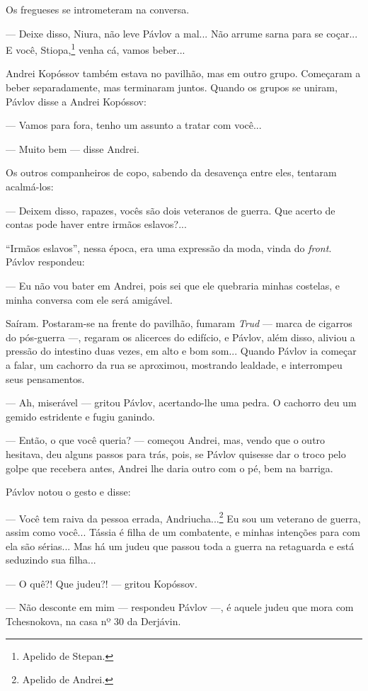 Os fregueses se intrometeram na conversa.

--- Deixe disso, Niura, não leve Pávlov a mal... Não arrume sarna para
se coçar... E você, Stiopa,\footnote{Apelido de Stepan.} venha cá, vamos
beber...

Andrei Kopóssov também estava no pavilhão, mas em outro grupo. Começaram
a beber separadamente, mas terminaram juntos. Quando os grupos se
uniram, Pávlov disse a Andrei Kopóssov:

--- Vamos para fora, tenho um assunto a tratar com você...

--- Muito bem --- disse Andrei.

Os outros companheiros de copo, sabendo da desavença entre eles,
tentaram acalmá-los:

--- Deixem disso, rapazes, vocês são dois veteranos de guerra. Que
acerto de contas pode haver entre irmãos eslavos?...

``Irmãos eslavos'', nessa época, era uma expressão da moda, vinda do
\emph{front}. Pávlov respondeu:

--- Eu não vou bater em Andrei, pois sei que ele quebraria minhas
costelas, e minha conversa com ele será amigável.

Saíram. Postaram-se na frente do pavilhão, fumaram \emph{Trud} --- marca
de cigarros do pós-guerra ---, regaram os alicerces do edifício, e
Pávlov, além disso, aliviou a pressão do intestino duas vezes, em alto e
bom som... Quando Pávlov ia começar a falar, um cachorro da rua se
aproximou, mostrando lealdade, e interrompeu seus pensamentos.

--- Ah, miserável --- gritou Pávlov, acertando-lhe uma pedra. O cachorro
deu um gemido estridente e fugiu ganindo.

--- Então, o que você queria? --- começou Andrei, mas, vendo que o outro
hesitava, deu alguns passos para trás, pois, se Pávlov quisesse dar o
troco pelo golpe que recebera antes, Andrei lhe daria outro com o pé,
bem na barriga.

Pávlov notou o gesto e disse:

--- Você tem raiva da pessoa errada, Andriucha...\footnote{Apelido de
  Andrei.} Eu sou um veterano de guerra, assim como você... Tássia é
filha de um combatente, e minhas intenções para com ela são sérias...
Mas há um judeu que passou toda a guerra na retaguarda e está seduzindo
sua filha...

--- O quê?! Que judeu?! --- gritou Kopóssov.

--- Não desconte em mim --- respondeu Pávlov ---, é aquele judeu que
mora com Tchesnokova, na casa nº 30 da Derjávin.


